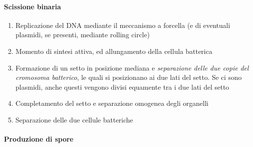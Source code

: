 \documentclass[italian,]{article}
\providecommand{\tightlist}{%
  \setlength{\itemsep}{0pt}\setlength{\parskip}{0pt}}
\begin{document}
\hypertarget{scissione-binaria}{%
\paragraph{Scissione binaria}\label{scissione-binaria}}

\begin{enumerate}
\def\labelenumi{\arabic{enumi}.}
\tightlist
\item
  Replicazione del DNA mediante il meccanismo a forcella (e di eventuali
  plasmidi, se presenti, mediante rolling circle)
\item
  Momento di sintesi attiva, ed allungamento della cellula batterica
\item
  Formazione di un setto in posizione mediana e \emph{separazione delle
  due copie del cromosoma batterico}, le quali si posizionano ai due
  lati del setto. Se ci sono plasmidi, anche questi vengono divisi
  equamente tra i due lati del setto
\item
  Completamento del setto e separazione omogenea degli organelli
\item
  Separazione delle due cellule batteriche
\end{enumerate}

\hypertarget{produzione-di-spore}{%
\paragraph{Produzione di spore}\label{produzione-di-spore}}
\end{document}

